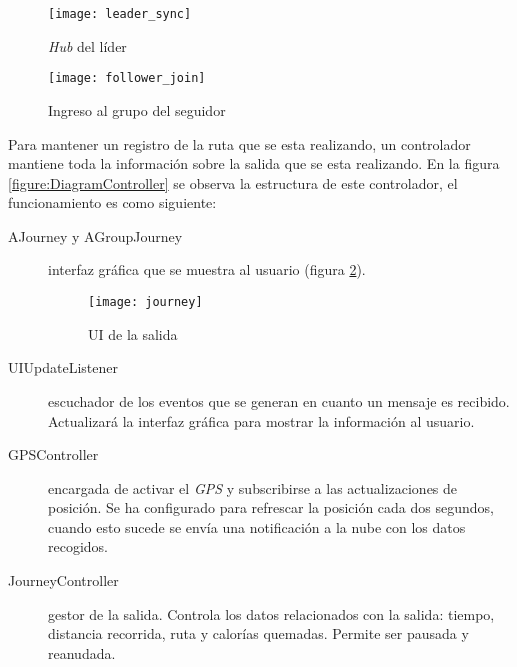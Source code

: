 \begin{figure}[H]
	\begin{minipage}{.5\textwidth}
		\begin{center}
			\texttt{[image: leader\_sync]}
			\caption{\emph{Hub} del líder}
			\label{figure:Hub}
		\end{center}
	\end{minipage}
\begin{minipage}{.5\textwidth}
	\begin{center}
		\texttt{[image: follower\_join]}
		\caption{Ingreso al grupo del seguidor}
		\label{figure:FollowerJoin}
	\end{center}
\end{minipage}
\end{figure}

Para mantener un registro de la ruta que se esta realizando, un controlador mantiene
toda la información sobre la salida que se esta realizando. En la figura
\ref{figure:DiagramController} se observa la estructura de este controlador, el
funcionamiento es como siguiente:
\begin{description}
	\item[AJourney y AGroupJourney] interfaz gráfica que se muestra al usuario
	(figura \ref{figure:Journey}).

	\begin{figure}[H]
		\begin{center}
			\texttt{[image: journey]}
			\caption{UI de la salida}
			\label{figure:Journey}
		\end{center}
	\end{figure}

	\item[UIUpdateListener] escuchador de los eventos que se generan en cuanto un
	mensaje es recibido. Actualizará la interfaz gráfica para mostrar la información
	al usuario.

	\item[GPSController] encargada de activar el \emph{GPS} y subscribirse a las
	actualizaciones de posición. Se ha configurado para refrescar la posición cada
	dos segundos, cuando esto sucede se envía una notificación a la nube con los
	datos recogidos.

	\item[JourneyController] gestor de la salida. Controla los datos relacionados
	con la salida: tiempo, distancia recorrida, ruta y calorías quemadas. Permite
	ser pausada y reanudada.
\end{description}

